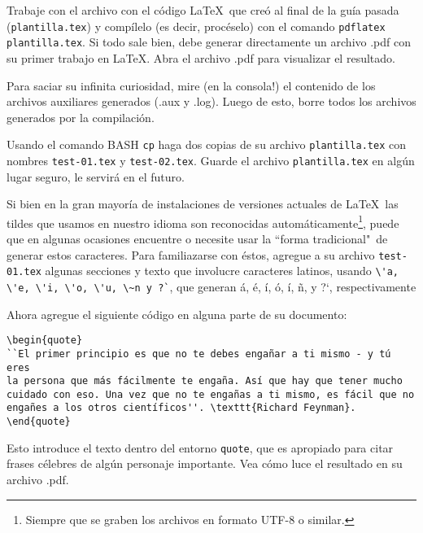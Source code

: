 \documentclass[11pt]{exam}
\begin{document}
\begin{questions}
\item Trabaje con el archivo con el código \LaTeX\ que creó al final de la guía pasada (\texttt{plantilla.tex}) y compílelo (es decir, procéselo) con el comando \texttt{pdflatex plantilla.tex}. Si todo sale bien, debe generar directamente un archivo .pdf con su primer trabajo en \LaTeX.
Abra el archivo .pdf para visualizar el resultado.

\item Para saciar su infinita curiosidad, mire (en la consola!) el contenido de los archivos auxiliares generados (.aux y .log). Luego de esto, borre todos los archivos generados por la compilación.

\item Usando el comando BASH \texttt{cp} haga dos copias de su archivo \texttt{plantilla.tex} con nombres \texttt{test-01.tex} y \texttt{test-02.tex}. Guarde el archivo \texttt{plantilla.tex} en algún lugar seguro, le servirá en el futuro.

\item Si bien en la gran mayoría de instalaciones de versiones actuales de \LaTeX\, las tildes que usamos en nuestro idioma son reconocidas automáticamente\footnote{Siempre que se graben los archivos en formato UTF-8 o similar.}, puede que en algunas ocasiones encuentre o necesite usar la ``forma tradicional"\, de generar estos caracteres. Para familiazarse con éstos, agregue a su archivo \texttt{test-01.tex} algunas secciones y texto que involucre caracteres latinos, usando \verb|\'a, \'e, \'i, \'o, \'u, \~n y ?`|, que generan á, é, í, ó, í, \~n, y ?`, respectivamente

\item Ahora agregue el siguiente código en alguna parte de su documento:

\begin{verbatim}
\begin{quote}
``El primer principio es que no te debes engañar a ti mismo - y tú eres 
la persona que más fácilmente te engaña. Así que hay que tener mucho 
cuidado con eso. Una vez que no te engañas a ti mismo, es fácil que no 
engañes a los otros científicos''. \texttt{Richard Feynman}.
\end{quote}
\end{verbatim}

Esto introduce el texto dentro del entorno \texttt{quote}, que es apropiado para citar frases célebres de algún personaje importante. Vea cómo luce el resultado en su archivo .pdf.


\end{questions}
\end{document}
